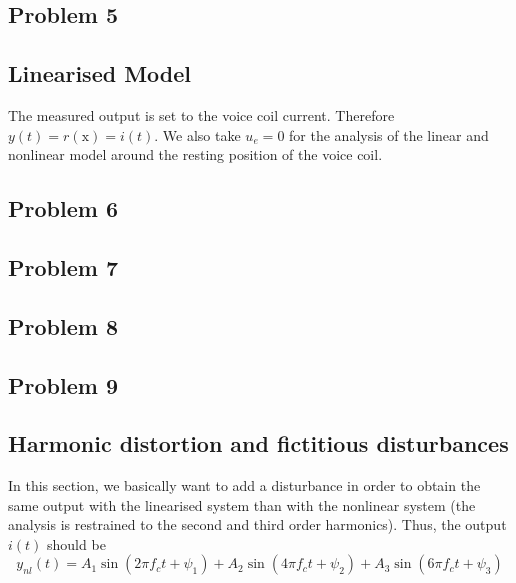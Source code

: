 \documentclass[12pt,a4paper,fleqn, onesside]{report}
\begin{document}
\subsection*{Problem 5}


\subsection{Linearised Model}
The measured output is set to the voice coil current. Therefore $y(t) = r(\text{x}) = i(t)$.
We also take $u_{e} = 0$ for the analysis of the linear and nonlinear model around the resting position of the voice coil. 

\subsection*{Problem 6}


\subsection*{Problem 7}


\subsection*{Problem 8}


\subsection*{Problem 9}


\subsection{Harmonic distortion and fictitious disturbances}
In this section, we basically want to add a disturbance in order to obtain the same output with the linearised system than with the nonlinear system (the analysis is restrained to the second and third order harmonics). Thus, the output $i(t)$ should be
\begin{equation}
\label{eq:output}
y_{nl}(t)=A_1\sin(2\pi f_ct+\psi_1)+A_2\sin(4\pi f_ct+\psi_2)+A_3\sin(6\pi f_ct+\psi_3)
\end{equation}
\end{document}
